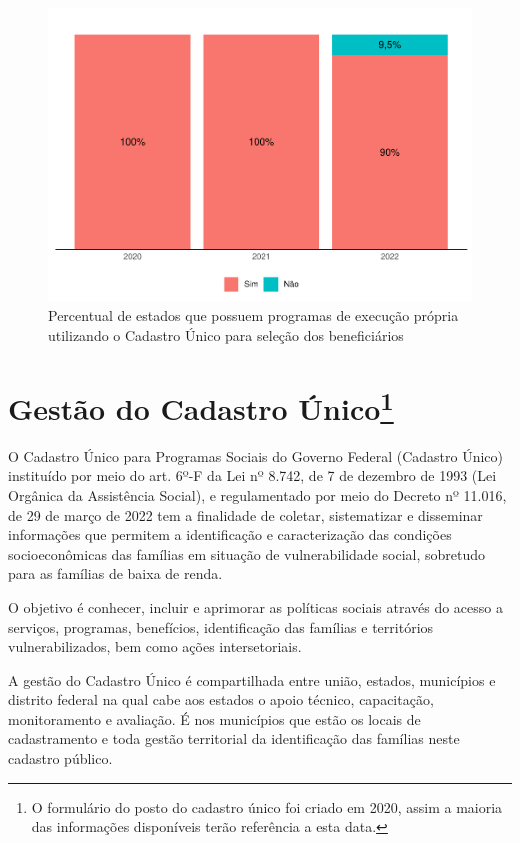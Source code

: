 \documentclass[
  brazilian]{report}
\begin{document}
\begin{figure}
\includegraphics{Censo-SUAS-2022_files/figure-latex/uf_usa_cad-1} \caption[Percentual de estados que possuem programas de execução própria utilizando o Cadastro Único para seleção dos beneficiários]{Percentual de estados que possuem programas de execução própria utilizando o Cadastro Único para seleção dos beneficiários}\label{fig:uf_usa_cad}
\end{figure}

\section[Gestão do Cadastro Único]{Gestão do Cadastro Único\footnote{O formulário do posto do cadastro único foi criado em 2020, assim a maioria das informações disponíveis terão referência a esta data.}}

O Cadastro Único para Programas Sociais do Governo Federal (Cadastro
Único) instituído por meio do art. 6º-F da Lei nº 8.742, de 7 de
dezembro de 1993 (Lei Orgânica da Assistência Social), e regulamentado
por meio do Decreto nº 11.016, de 29 de março de 2022 tem a finalidade
de coletar, sistematizar e disseminar informações que permitem a
identificação e caracterização das condições socioeconômicas das
famílias em situação de vulnerabilidade social, sobretudo para as
famílias de baixa de renda.

O objetivo é conhecer, incluir e aprimorar as políticas sociais através
do acesso a serviços, programas, benefícios, identificação das famílias
e territórios vulnerabilizados, bem como ações intersetoriais.

A gestão do Cadastro Único é compartilhada entre união, estados,
municípios e distrito federal na qual cabe aos estados o apoio técnico,
capacitação, monitoramento e avaliação. É nos municípios que estão os
locais de cadastramento e toda gestão territorial da identificação das
famílias neste cadastro público.
\end{document}
